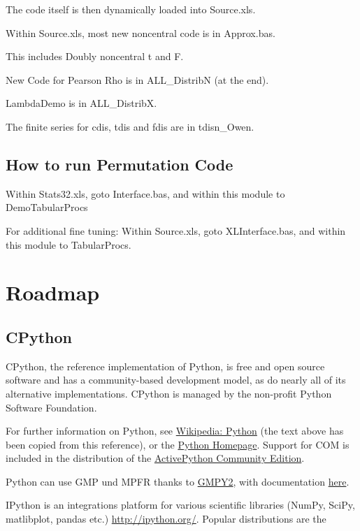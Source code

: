 The code itself is then dynamically loaded into Source.xls.

Within Source.xls, most new noncentral code is in Approx.bas.

This includes Doubly noncentral t and F.

New Code for Pearson Rho is in ALL\_DistribN (at the end).

LambdaDemo is in ALL\_DistribX.

The finite series for cdis, tdis and fdis are in tdisn\_Owen.


\section{How to run Permutation Code}

Within Stats32.xls, goto Interface.bas, and within this module to DemoTabularProcs

For additional fine tuning: 
Within Source.xls, goto XLInterface.bas, and within this module to TabularProcs.





\chapter{Roadmap}
\label{Roadmap}




\newpage
\section{CPython}

CPython, the reference implementation of Python, is free and open source software and has a community-based development model, as do nearly all of its alternative implementations. CPython is managed by the non-profit Python Software Foundation.

\vpara
For further information on Python, see \href{http://en.wikipedia.org/wiki/Python_(programming_language)}{Wikipedia: Python} (the text above has been copied from this reference), or the  \href{http://www.python.org/}{Python Homepage}. Support for COM is included in the distribution of the \href{http://www.activestate.com/activepython/downloads}{ActivePython Community Edition}.

\vpara
Python can use  GMP und MPFR thanks to \href{http://code.google.com/p/gmpy/}{GMPY2}, with documentation \href{https://gmpy2.readthedocs.org/en/latest/}{here}.

\vpara
IPython is an integrations platform for various scientific libraries (NumPy, SciPy, matlibplot, pandas etc.) \href{http://ipython.org/}{http://ipython.org/}. Popular distributions are the 

